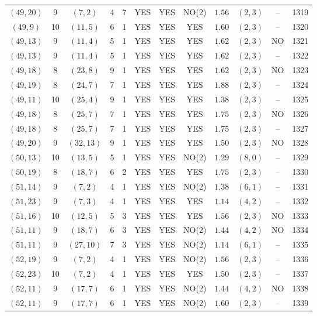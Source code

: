 \begin{longtable}{|c|c|c|c|c|c|c|c|c|c|c|c|}
$(49,20)$ & 9 & $(7,2)$ & 4 & 7 & YES & YES & NO(2) & $1.56$ & $(2,3)$ & -- & 1319\\
$(49,9)$ & 10 & $(11,5)$ & 6 & 1 & YES & YES & YES & $1.60$ & $(2,3)$ & -- & 1320\\
$(49,13)$ & 9 & $(11,4)$ & 5 & 1 & YES & YES & YES & $1.62$ & $(2,3)$ & NO & 1321\\
$(49,13)$ & 9 & $(11,4)$ & 5 & 1 & YES & YES & YES & $1.62$ & $(2,3)$ & -- & 1322\\
$(49,18)$ & 8 & $(23,8)$ & 9 & 1 & YES & YES & YES & $1.62$ & $(2,3)$ & NO & 1323\\
$(49,19)$ & 8 & $(24,7)$ & 7 & 1 & YES & YES & YES & $1.88$ & $(2,3)$ & -- & 1324\\
$(49,11)$ & 10 & $(25,4)$ & 9 & 1 & YES & YES & YES & $1.38$ & $(2,3)$ & -- & 1325\\
$(49,18)$ & 8 & $(25,7)$ & 7 & 1 & YES & YES & YES & $1.75$ & $(2,3)$ & NO & 1326\\
$(49,18)$ & 8 & $(25,7)$ & 7 & 1 & YES & YES & YES & $1.75$ & $(2,3)$ & -- & 1327\\
$(49,20)$ & 9 & $(32,13)$ & 9 & 1 & YES & YES & YES & $1.50$ & $(2,3)$ & NO & 1328\\
$(50,13)$ & 10 & $(13,5)$ & 5 & 1 & YES & YES & NO(2) & $1.29$ & $(8,0)$ & -- & 1329\\
$(50,19)$ & 8 & $(18,7)$ & 6 & 2 & YES & YES & YES & $1.75$ & $(2,3)$ & -- & 1330\\
$(51,14)$ & 9 & $(7,2)$ & 4 & 1 & YES & YES & NO(2) & $1.38$ & $(6,1)$ & -- & 1331\\
$(51,23)$ & 9 & $(7,3)$ & 4 & 1 & YES & YES & YES & $1.14$ & $(4,2)$ & -- & 1332\\
$(51,16)$ & 10 & $(12,5)$ & 5 & 3 & YES & YES & YES & $1.56$ & $(2,3)$ & NO & 1333\\
$(51,11)$ & 9 & $(18,7)$ & 6 & 3 & YES & YES & NO(2) & $1.44$ & $(4,2)$ & NO & 1334\\
$(51,11)$ & 9 & $(27,10)$ & 7 & 3 & YES & YES & NO(2) & $1.14$ & $(6,1)$ & -- & 1335\\
$(52,19)$ & 9 & $(7,2)$ & 4 & 1 & YES & YES & NO(2) & $1.56$ & $(2,3)$ & -- & 1336\\
$(52,23)$ & 10 & $(7,2)$ & 4 & 1 & YES & YES & YES & $1.50$ & $(2,3)$ & -- & 1337\\
$(52,11)$ & 9 & $(17,7)$ & 6 & 1 & YES & YES & NO(2) & $1.44$ & $(4,2)$ & NO & 1338\\
$(52,11)$ & 9 & $(17,7)$ & 6 & 1 & YES & YES & NO(2) & $1.60$ & $(2,3)$ & -- & 1339\\

\end{longtable}
